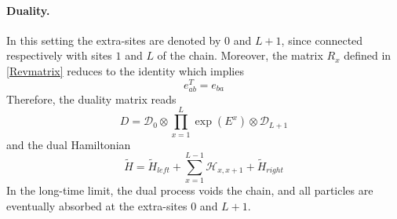 \documentclass[11pt]{article}
\numberwithin{equation}{section}
\numberwithin{equation}{subsection}
\begin{document}
\paragraph{Duality.} 
In this setting the extra-sites are denoted by $0$ and $L+1$, since connected respectively with sites $1$ and $L$ of the chain. Moreover, the matrix $R_{x}$ defined in \eqref{Revmatrix} 
reduces to the identity which implies 
\begin{equation}\label{transpostionPropertyFund}
e_{ab}^T= e_{ba}
\end{equation}
 Therefore, the duality matrix reads
\begin{equation}
	D=\mathcal{D}_{0}\otimes\prod_{x=1}^{L}\exp{(E^{x})}\otimes \mathcal{D}_{L+1}
\end{equation}
and the dual Hamiltonian 
\begin{equation}
	\widetilde{H}=\widetilde{H}_{left}+\sum_{x=1}^{L-1}\mathcal{H}_{x,x+1}+\widetilde{H}_{right}
\end{equation}
In the long-time limit, the dual process voids the chain, and all particles are eventually absorbed at the extra-sites $0$ and $L+1$.
\end{document}
